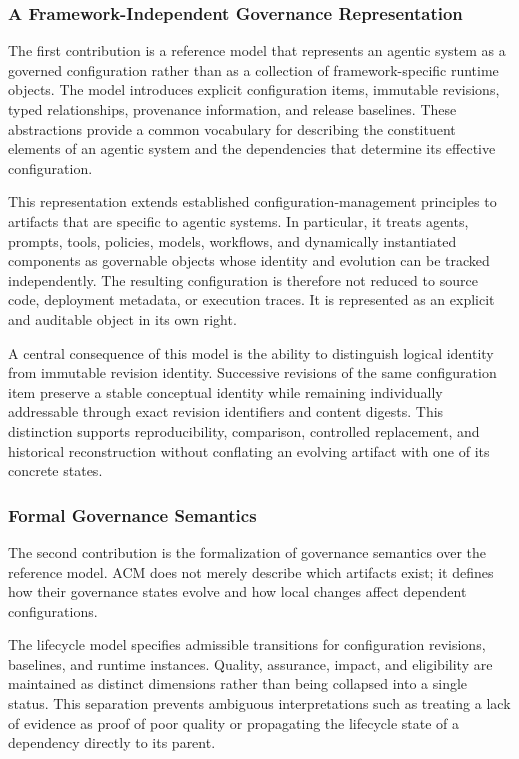 \documentclass[10pt]{article}
\begin{document}
\subsubsection{A Framework-Independent Governance Representation}

The first contribution is a reference model that represents an agentic system as a governed configuration rather than as a collection of framework-specific runtime objects. The model introduces explicit configuration items, immutable revisions, typed relationships, provenance information, and release baselines. These abstractions provide a common vocabulary for describing the constituent elements of an agentic system and the dependencies that determine its effective configuration.

This representation extends established configuration-management principles to artifacts that are specific to agentic systems. In particular, it treats agents, prompts, tools, policies, models, workflows, and dynamically instantiated components as governable objects whose identity and evolution can be tracked independently. The resulting configuration is therefore not reduced to source code, deployment metadata, or execution traces. It is represented as an explicit and auditable object in its own right.

A central consequence of this model is the ability to distinguish logical identity from immutable revision identity. Successive revisions of the same configuration item preserve a stable conceptual identity while remaining individually addressable through exact revision identifiers and content digests. This distinction supports reproducibility, comparison, controlled replacement, and historical reconstruction without conflating an evolving artifact with one of its concrete states.

\subsubsection{Formal Governance Semantics}

The second contribution is the formalization of governance semantics over the reference model. ACM does not merely describe which artifacts exist; it defines how their governance states evolve and how local changes affect dependent configurations.

The lifecycle model specifies admissible transitions for configuration revisions, baselines, and runtime instances. Quality, assurance, impact, and eligibility are maintained as distinct dimensions rather than being collapsed into a single status. This separation prevents ambiguous interpretations such as treating a lack of evidence as proof of poor quality or propagating the lifecycle state of a dependency directly to its parent.
\end{document}
